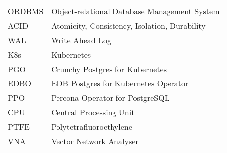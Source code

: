 
\seznamzkr

\begin{tabular}{ll}
    ORDBMS & Object-relational Database Management System  \\
    ACID   & Atomicity, Consistency, Isolation, Durability \\
    WAL    & Write Ahead Log                               \\
    K8s    & Kubernetes                                    \\
    PGO    & Crunchy Postgres for Kubernetes               \\
    EDBO   & EDB Postgres for Kubernetes Operator          \\
    PPO    & Percona Operator for PostgreSQL               \\
    CPU    & Central Processing Unit                       \\
    PTFE   & Polytetrafluoroethylene                       \\
    VNA    & Vector Network Analyser                       \\
\end{tabular}

